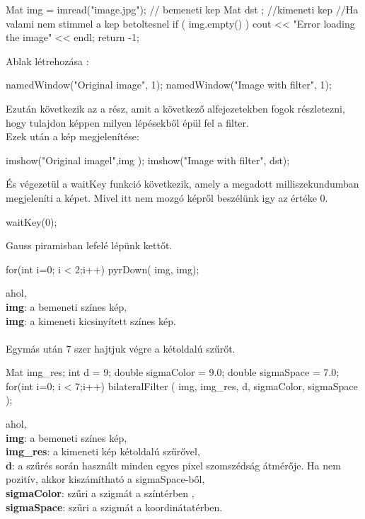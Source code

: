 \begin{cpp}
    Mat img = imread("image.jpg"); // bemeneti kep
    Mat dst ; //kimeneti kep
    //Ha valami nem stimmel a kep betoltesnel
    if ( img.empty() )
    {
        cout << "Error loading the image" << endl;
        return -1;
    }
\end{cpp} 
Ablak létrehozása :
\begin{cpp}
    namedWindow("Original image", 1);
    namedWindow("Image with filter", 1);
\end{cpp}
Ezután következik az a rész, amit a következő alfejezetekben fogok részletezni, hogy tulajdon képpen milyen lépésekből épül fel a filter. \\
Ezek után a kép megjelenítése:
\begin{cpp}
    imshow("Original imagel",img );
    imshow("Image with filter", dst);
\end{cpp}
És végezetül a waitKey funkció következik, amely a megadott milliszekundumban megjeleníti a képet. Mivel itt nem mozgó képről beszélünk igy az értéke 0.
 \begin{cpp}
    waitKey(0);
\end{cpp}
Gauss piramisban lefelé lépünk kettőt.
\begin{cpp}
 for(int i=0; i < 2;i++){
    pyrDown( img, img);
    }
\end{cpp}
ahol, \\
\indent \textbf{img}: a bemeneti színes kép,\\
\indent \textbf{img}: a kimeneti kicsinyített színes kép.\\\\
Egymás után 7 szer hajtjuk végre a kétoldalú szűrőt.\\
\begin{cpp}
Mat img_res;
int d = 9;
double sigmaColor = 9.0;
double sigmaSpace = 7.0;
for(int i=0; i < 7;i++){
    bilateralFilter ( img, img_res, d, sigmaColor, sigmaSpace );
    }
\end{cpp}
ahol, \\
\indent \textbf{img}: a bemeneti színes kép,\\
\indent \textbf{img\_res}: a kimeneti kép kétoldalú szűrővel,\\
\indent \textbf{d}: a szűrés során használt minden egyes pixel szomszédság átmérője. Ha nem pozitív, akkor kiszámítható a sigmaSpace-ből,\\
\indent \textbf{sigmaColor}: szűri a szigmát a színtérben ,\\
\indent \textbf{sigmaSpace}: szűri a szigmát a koordinátatérben.\\ \\
